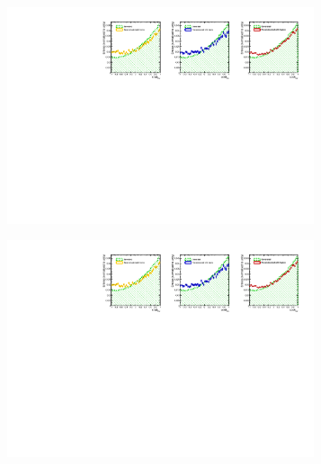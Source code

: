 \begin{figure}[H]
	\centering
	\begin{subfigure}{0.33\textwidth}
		\includegraphics[clip, trim=0.1cm 0cm 13.9cm 0cm,width=0.99\textwidth]{ILD/plots/one-charge.pdf}
		\caption{\label{fig:OneCharge_a_3} }
	\end{subfigure}%
	\begin{subfigure}{0.33\textwidth}
		\centering
		\includegraphics[clip, trim=6.78cm 0cm 7.3cm 0cm,width=0.99\textwidth]{ILD/plots/one-charge.pdf}
		\caption{\label{fig:OneCharge_b_3} }
	\end{subfigure}
	\begin{subfigure}{0.33\textwidth}
		\centering

\end{subfigure}
\end{figure}
